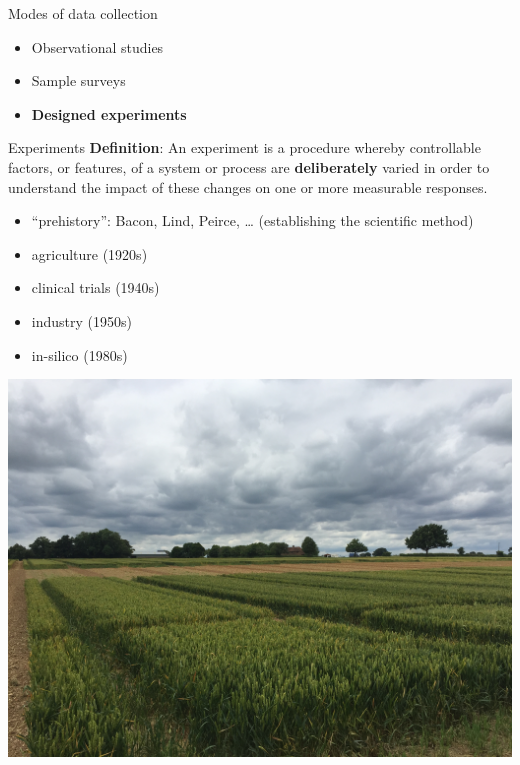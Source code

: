 \documentclass[
  ignorenonframetext,
]{beamer}
\providecommand{\tightlist}{%
  \setlength{\itemsep}{0pt}\setlength{\parskip}{0pt}}
\begin{document}
\begin{frame}{Modes of data collection}
\protect\hypertarget{modes-of-data-collection}{}
\begin{itemize}
\tightlist
\item
  Observational studies
\item
  Sample surveys
\item
  \textbf{Designed experiments}
\end{itemize}
\end{frame}

\begin{frame}{Experiments}
\protect\hypertarget{experiments}{}
\textbf{Definition}: An experiment is a procedure whereby controllable
factors, or features, of a system or process are \textbf{deliberately}
varied in order to understand the impact of these changes on one or more
measurable responses.

\begin{itemize}
\tightlist
\item
  ``prehistory'': Bacon, Lind, Peirce, \ldots{} (establishing the
  scientific method)
\item
  agriculture (1920s)
\item
  clinical trials (1940s)
\item
  industry (1950s)
\item
  in-silico (1980s)
\end{itemize}

\includegraphics[width=0.75\linewidth,style="display: block; margin-left: auto; margin-right: auto;"]{figures/broadbalk}
\end{frame}
\end{document}
